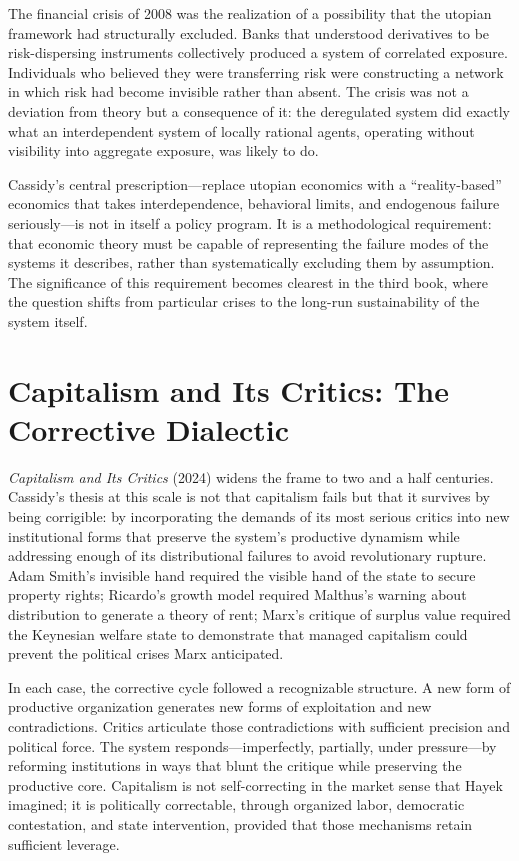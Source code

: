 \documentclass[11pt, a4paper]{article}
\theoremstyle{plain}
\theoremstyle{definition}
\begin{document}
The financial crisis of 2008 was the realization of a possibility that the
utopian framework had structurally excluded. Banks that understood derivatives
to be risk-dispersing instruments collectively produced a system of correlated
exposure. Individuals who believed they were transferring risk were constructing
a network in which risk had become invisible rather than absent. The crisis was
not a deviation from theory but a consequence of it: the deregulated system did
exactly what an interdependent system of locally rational agents, operating
without visibility into aggregate exposure, was likely to do.

Cassidy's central prescription---replace utopian economics with a
``reality-based'' economics that takes interdependence, behavioral limits,
and endogenous failure seriously---is not in itself a policy program. It is
a methodological requirement: that economic theory must be capable of
representing the failure modes of the systems it describes, rather than
systematically excluding them by assumption. The significance of this
requirement becomes clearest in the third book, where the question shifts
from particular crises to the long-run sustainability of the system itself.

\section{Capitalism and Its Critics: The Corrective Dialectic}

\emph{Capitalism and Its Critics} (2024) widens the frame to two and a half
centuries. Cassidy's thesis at this scale is not that capitalism fails but that
it survives by being corrigible: by incorporating the demands of its most
serious critics into new institutional forms that preserve the system's
productive dynamism while addressing enough of its distributional failures to
avoid revolutionary rupture. Adam Smith's invisible hand required the visible
hand of the state to secure property rights; Ricardo's growth model required
Malthus's warning about distribution to generate a theory of rent; Marx's
critique of surplus value required the Keynesian welfare state to demonstrate
that managed capitalism could prevent the political crises Marx anticipated.

In each case, the corrective cycle followed a recognizable structure. A new
form of productive organization generates new forms of exploitation and new
contradictions. Critics articulate those contradictions with sufficient
precision and political force. The system responds---imperfectly, partially,
under pressure---by reforming institutions in ways that blunt the critique
while preserving the productive core. Capitalism is not self-correcting in
the market sense that Hayek imagined; it is politically correctable, through
organized labor, democratic contestation, and state intervention, provided
that those mechanisms retain sufficient leverage.
\end{document}
